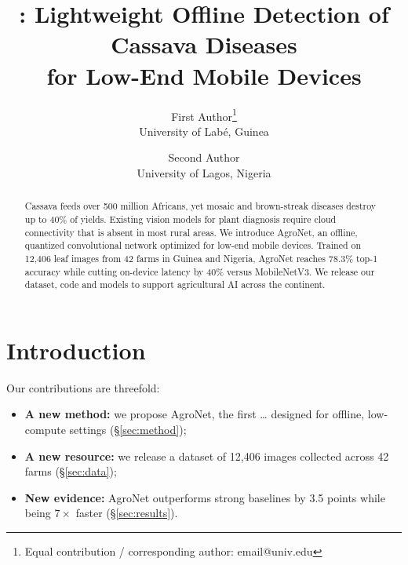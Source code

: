 \documentclass[11pt,a4paper]{article}
\title{%
\model{}: Lightweight Offline Detection of Cassava Diseases\\
for Low-End Mobile Devices}
\author{%
  First Author\thanks{Equal contribution / corresponding author: email@univ.edu} \\
  University of Labé, Guinea
  \and
  Second Author \\
  University of Lagos, Nigeria
}
\date{}
\newcommand{\model}{AgroNet}     %
\begin{document}
\maketitle

\begin{abstract}
Cassava feeds over 500 million Africans, yet mosaic and brown-streak
diseases destroy up to 40\% of yields.
Existing vision models for plant diagnosis require cloud connectivity
that is absent in most rural areas.
We introduce \model{}, an offline, quantized convolutional network
optimized for low-end mobile devices.
Trained on 12{,}406 leaf images from 42 farms in Guinea and Nigeria,
\model{} reaches 78.3\% top-1 accuracy while cutting on-device latency
by 40\% versus MobileNetV3.
We release our dataset, code and models to support agricultural AI
across the continent.
\end{abstract}

\section{Introduction}
Our contributions are threefold:
\begin{itemize}
  \item \textbf{A new method:} we propose \model{}, the first \ldots
        designed for offline, low-compute settings (\S\ref{sec:method});
  \item \textbf{A new resource:} we release a dataset of 12{,}406
        images collected across 42 farms (\S\ref{sec:data});
  \item \textbf{New evidence:} \model{} outperforms strong baselines
        by 3.5 points while being $7\times$ faster (\S\ref{sec:results}).
\end{itemize}
\end{document}
